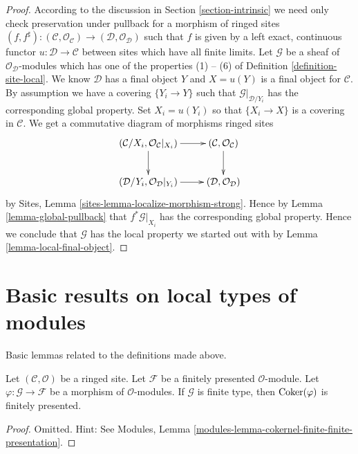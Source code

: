 \begin{proof}
According to the discussion in Section \ref{section-intrinsic}
we need only check preservation under pullback for a morphism of ringed sites
$(f, f^\sharp) :
(\mathcal{C}, \mathcal{O}_\mathcal{C})
\to
(\mathcal{D}, \mathcal{O}_\mathcal{D})$
such that $f$ is given by a left exact, continuous functor
$u : \mathcal{D} \to \mathcal{C}$ between sites which have
all finite limits.
Let $\mathcal{G}$ be a sheaf of $\mathcal{O}_\mathcal{D}$-modules
which has one of the properties (1) -- (6) of
Definition \ref{definition-site-local}.
We know $\mathcal{D}$ has a final object $Y$ and $X = u(Y)$
is a final object for $\mathcal{C}$. By assumption we have
a covering $\{Y_i \to Y\}$ such that $\mathcal{G}|_{\mathcal{D}/Y_i}$
has the corresponding global property. Set $X_i = u(Y_i)$ so
that $\{X_i \to X\}$ is a covering in $\mathcal{C}$.
We get a commutative diagram of morphisms ringed sites
$$
\xymatrix{
(\mathcal{C}/X_i, \mathcal{O}_\mathcal{C}|_{X_i}) \ar[r] \ar[d] &
(\mathcal{C}, \mathcal{O}_\mathcal{C}) \ar[d] \\
(\mathcal{D}/Y_i, \mathcal{O}_\mathcal{D}|_{Y_i}) \ar[r] &
(\mathcal{D}, \mathcal{O}_\mathcal{D})
}
$$
by Sites, Lemma \ref{sites-lemma-localize-morphism-strong}.
Hence by Lemma \ref{lemma-global-pullback}
that $f^*\mathcal{G}|_{X_i}$ has the corresponding global
property. Hence we conclude that $\mathcal{G}$ has the local
property we started out with by Lemma \ref{lemma-local-final-object}.
\end{proof}







\section{Basic results on local types of modules}
\label{section-basics}

\noindent
Basic lemmas related to the definitions made above.

\begin{lemma}
\label{lemma-cokernel-finite-finite-presentation}
Let $(\mathcal{C},\mathcal{O})$ be a ringed site. Let $\mathcal{F}$ be a
finitely presented $\mathcal{O}$-module. Let
$\varphi : \mathcal{G} \to \mathcal{F}$ be a morphism of
$\mathcal{O}$-modules. If $\mathcal{G}$ is finite type, then
$\mathop{\mathrm{Coker}}(\varphi)$ is finitely presented.
\end{lemma}

\begin{proof}
Omitted. Hint: See Modules, Lemma
\ref{modules-lemma-cokernel-finite-finite-presentation}.
\end{proof}

